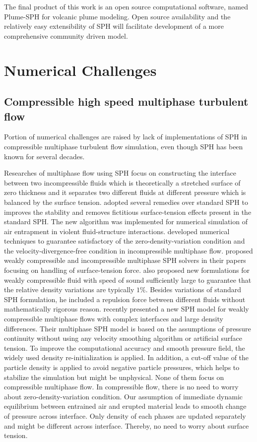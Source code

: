The final product of this work is an open source computational software, named Plume-SPH for volcanic plume modeling. Open source availability and the relatively easy extensibility of SPH will facilitate development of a more comprehensive community driven model.

\section{Numerical Challenges}

\subsection{Compressible high speed multiphase turbulent flow}
Portion of numerical challenges are raised by lack of implementations of SPH in compressible multiphase turbulent flow simulation, even though SPH has been known for several decades.

Researches of multiphase flow using SPH focus on constructing the interface between two incompressible fluids which is theoretically a stretched surface of zero thickness and it separates two different fluids at different pressure which is balanced by the surface tension.
\citet{colagrossi2003numerical} adopted several remedies over standard SPH to improves the stability and removes fictitious surface-tension effects present in the standard SPH. The new algorithm was implemented for numerical simulation of air entrapment in violent fluid-structure interactions. \citet{hu2007incompressible} developed numerical techniques to guarantee satisfactory of the zero-density-variation condition and the velocity-divergence-free condition in incompressible multiphase flow. \citet{adami2010new} proposed weakly compressible and incompressible multiphase SPH solvers in their papers focusing on handling of surface-tension force. \citet{monaghan2013simple} also proposed new formulations for weakly compressible fluid with speed of sound sufficiently large to guarantee that the relative density variations are typically $1\%$. Besides variations of standard SPH formulation, he included a repulsion force between different fluids without mathematically rigorous reason. \citet {chen2015sph} recently presented a new SPH model for weakly compressible multiphase flows with complex interfaces and large density differences. Their multiphase SPH model is based on the assumptions of pressure continuity without using any velocity smoothing algorithm or artificial surface tension. To improve the computational accuracy and smooth pressure field, the widely used density re-initialization is applied. In addition, a cut-off value of the particle density is applied to avoid negative particle pressures, which helps to stabilize the simulation but might be unphysical. None of them focus on compressible multiphase flow.
In compressible flow, there is no need to worry about zero-density-variation condition. Our assumption of immediate dynamic equilibrium between entrained air and erupted material leads to smooth change of pressure across interface. Only density of each phases are updated separately and might be different across interface. Thereby, no need to worry about surface tension.
 
